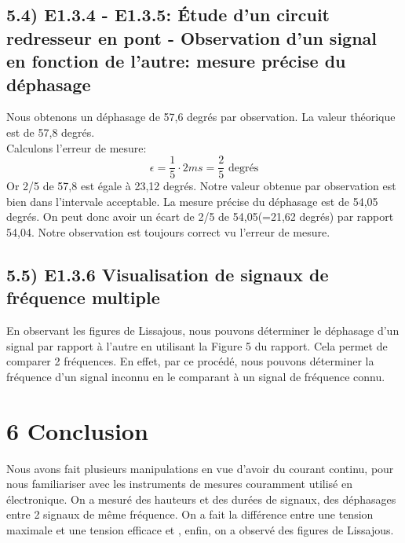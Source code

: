 \documentclass{report}
\begin{document}
\subsection*{5.4) E1.3.4 - E1.3.5: \'Etude d'un circuit redresseur en pont - Observation d'un signal en fonction de l'autre: mesure pr\'ecise du d\'ephasage}
\hspace*{0.5cm}
Nous obtenons un d\'ephasage de 57,6 degr\'es par observation. La valeur th\'eorique est de 57,8 degr\'es.
\\
Calculons l'erreur de mesure:
\begin{equation}
    \epsilon = \frac{1}{5}\cdot 2ms = \frac{2}{5} \text{ degr\'es}
\end{equation}
Or 2/5 de 57,8 est \'egale \`a 23,12 degr\'es. Notre valeur obtenue par observation est bien dans l'intervale acceptable. La mesure pr\'ecise du d\'ephasage est de 54,05 degr\'es. On peut donc avoir un \'ecart de 2/5 de 54,05(=21,62 degr\'es) par rapport 54,04. Notre observation est toujours correct vu l'erreur de mesure.

\subsection*{5.5) E1.3.6 Visualisation de signaux de fr\'equence multiple}
\hspace*{0.5cm}
En observant les figures de Lissajous, nous pouvons d\'eterminer le d\'ephasage d'un signal par rapport \`a l'autre en utilisant la Figure 5 du rapport. Cela permet de comparer 2 fr\'equences. En effet, par ce proc\'ed\'e, nous pouvons d\'eterminer la fr\'equence d'un signal inconnu en le comparant à un signal de fr\'equence connu.

\section*{6 Conclusion}
\hspace*{0.5cm}
Nous avons fait plusieurs manipulations en vue d'avoir du courant continu, pour nous familiariser avec les instruments de mesures couramment utilis\'e en \'electronique. On a mesur\'e des hauteurs et des dur\'ees de signaux, des d\'ephasages entre 2 signaux de m\^eme fr\'equence. On a fait la diff\'erence entre une tension maximale et une tension efficace et , enfin, on a observ\'e des figures de Lissajous.
\end{document}

